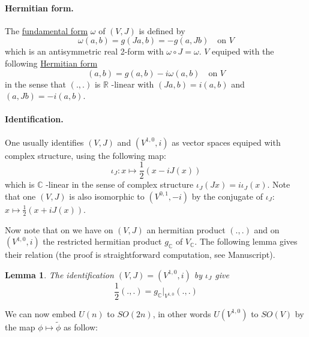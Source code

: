 \documentclass[11pt]{article}
\newtheorem{lemma}[theorem]{Lemma}
\begin{document}
\paragraph*{Hermitian form.}
\label{sec:orga82cf8d}
The \uline{fundamental form} \(\omega\) of \((V,J)\) is defined by
\[
\omega(a,b) = g(Ja,b) = -g(a, Jb) \quad \text{on } V
\]
which is an antisymmetric real 2-form with \(\omega\circ J = \omega\). \(V\) equiped with the following
\uline{Hermitian form}
\[
(a,b) = g(a,b) - i\omega(a,b)  \quad \text{on } V
\]
in the sense that \((.,.)\) is \(\mathbb{R}\) -linear with \((Ja,b) = i(a,b)\) and \((a,Jb) = -i(a,b)\).

\paragraph*{Identification.}
\label{sec:org1a9a522}
One usually identifies \((V,J)\) and \((V^{1,0},i)\) as vector spaces equiped with complex structure,
using the following map:
\[
\iota_J: x \mapsto \frac{1}{2}(x - iJ(x))
\]
which is \(\mathbb{C}\) -linear in the sense of complex structure \(\iota_J(Jx) = i\iota_J(x)\). Note
that one \((V,J)\) is also isomorphic to \((V^{0,1},-i)\) by the conjugate of \(\iota_J\): \(x\mapsto
\frac{1}{2}(x + iJ(x))\).

Now note that on we have on \((V,J)\) an hermitian product \((.,.)\) and on \((V^{1,0},i)\) the restricted
hermitian product \(g_{\mathbb{C}}\) of \(V_{\mathbb{C}}\). The following lemma gives their relation
(the proof is straightforward computation, see Manuscript).

\begin{lemma}
The identification \((V,J) = (V^{1,0},i)\) by \(\iota_J\) give
\[
\frac{1}{2}(.,.) = g_\mathbb{C}|_{V^{1,0}}(.,.)
\]
\end{lemma}


We can now embed \(U(n)\) to \(SO(2n)\), in other words \(U(V^{1,0})\) to \(SO(V)\) by the map
\(\phi\mapsto \tilde\phi\) as follow:
\end{document}
